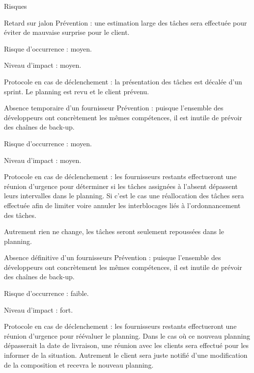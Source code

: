 \documentclass[]{article}
\begin{document}
    \begin{section}{Risques}
        \begin{subsection}{Retard sur jalon}
            Prévention : une estimation large des tâches sera effectuée pour éviter de mauvaise surprise pour le
            client.

            Risque d’occurrence : moyen.

            Niveau d’impact : moyen.

            Protocole en cas de déclenchement : la présentation des tâches est décalée d’un sprint. 
            Le planning est revu et le client prévenu.
        \end{subsection}

        \begin{subsection}{Absence temporaire d’un fournisseur}
            Prévention : puisque l’ensemble des développeurs ont concrètement les mêmes compétences, il est
            inutile de prévoir des chaînes de back-up.

            Risque d’occurrence : moyen.

            Niveau d’impact : moyen.

            Protocole en cas de déclenchement : les fournisseurs restants effectueront une réunion d’urgence pour déterminer 
            si les tâches assignées à l’absent dépassent leurs intervalles dans le planning. Si c’est le cas 
            une réallocation des tâches sera effectuée afin de limiter voire annuler les interblocages liés à 
            l’ordonnancement des tâches.

            Autrement rien ne change, les tâches seront seulement repoussées dans le planning.
        \end{subsection}

        \begin{subsection}{Absence définitive d’un fournisseurs}
            Prévention : puisque l’ensemble des développeurs ont concrètement les mêmes compétences, il est
            inutile de prévoir des chaînes de back-up.

            Risque d’occurrence : faible.

            Niveau d’impact : fort.

            Protocole en cas de déclenchement : les fournisseurs restants effectueront une réunion d’urgence pour réévaluer le 
            planning. Dans le cas où ce nouveau planning dépasserait la date de livraison, une réunion avec les clients sera 
            effectué pour les informer de la situation. Autrement le client sera juste notifié d’une modification de la 
            composition et recevra le nouveau planning.
        \end{subsection}


\end{section}
\end{document}
